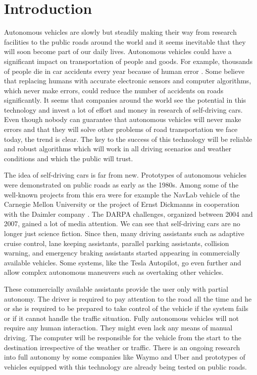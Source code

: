\chapter*{Introduction}

Autonomous vehicles are slowly but steadily making their way from research facilities to the public roads around the world and it seems inevitable that they will soon become part of our daily lives. Autonomous vehicles could have a significant impact on transportation of people and goods. For example, thousands of people die in car accidents every year because of human error \cite{Road_accidents}. Some believe that replacing humans with accurate electronic sensors and computer algorithms, which never make errors, could reduce the number of accidents on roads significantly. It seems that companies around the world see the potential in this technology and invest a lot of effort and money in research of self-driving cars. Even though nobody can guarantee that autonomous vehicles will never make errors and that they will solve other problems of road transportation we face today, the trend is clear. The key to the success of this technology will be reliable and robust algorithms which will work in all driving scenarios and weather conditions and which the public will trust.

The idea of self-driving cars is far from new. Prototypes of autonomous vehicles were demonstrated on public roads as early as the 1980s. Among some of the well-known projects from this era were for example the NavLab vehicle of the Carnegie Mellon University \cite{NavLab} or the project of Ernst Dickmanns in cooperation with the Daimler company \cite{Ernst_Dickmanns}. The DARPA challenges, organized between 2004 and 2007, gained a lot of media attention. We can see that self-driving cars are no longer just science fiction. Since then, many driving assistants such as adaptive cruise control, lane keeping assistants, parallel parking assistants, collision warning, and emergency braking assistants started appearing in commercially available vehicles. Some systems, like the Tesla Autopilot, go even further and allow complex autonomous maneuvers such as overtaking other vehicles.

These commercially available assistants provide the user only with partial autonomy. The driver is required to pay attention to the road all the time and he or she is required to be prepared to take control of the vehicle if the system fails or if it cannot handle the traffic situation. Fully autonomous vehicles will not require any human interaction. They might even lack any means of manual driving. The computer will be responsible for the vehicle from the start to the destination irrespective of the weather or traffic. There is an ongoing research into full autonomy by some companies like Waymo and Uber and prototypes of vehicles equipped with this technology are already being tested on public roads.

